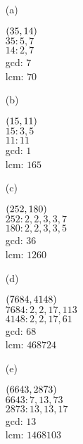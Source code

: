 \begin{mdframed}[style=darkAnswer,frametitle={Joe Starr}]
    \begin{multicols}{2}
    \begin{itemize}
        \item [(a)] {
        \begin{multicols}{2}
        $\left(35,14\right)$\\
        $35: 5,7$ \\
        $14: 2,7$ \\
        gcd: $7$ \\
        lcm: $70$ 
        \end{multicols}
        }
        \item [(b)] {
            \begin{multicols}{2}
        $\left(15,11\right)$ \\
        $15: 3,5$ \\
        $11: 11$ \\
        gcd: $1$ \\
        lcm: $165$ 
    \end{multicols}
        }
        \item [(c)] {
            \begin{multicols}{2}
        $\left(252,180\right)$ \\
        $252: 2,2,3,3,7$ \\
        $180: 2,2,3,3,5$ \\
        gcd: $36$ \\
        lcm: $1260$ 
    \end{multicols}
        }
        \item [(d)] {
            \begin{multicols}{2}
        $\left(7684,4148\right)$ \\
        $7684: 2,2,17,113$ \\
        $4148: 2,2,17,61$ \\
        gcd: $68$ \\
        lcm: $468724$ 
    \end{multicols}
        }
        \item [(e)] {
            \begin{multicols}{2}
        $\left(6643,2873\right)$ \\
        $6643: 7,13,73$ \\
        $2873: 13,13,17$ \\
        gcd: $13$ \\
        lcm: $1468103$ 
    \end{multicols}
        }
    \end{itemize}
\end{multicols}
\end{mdframed}
